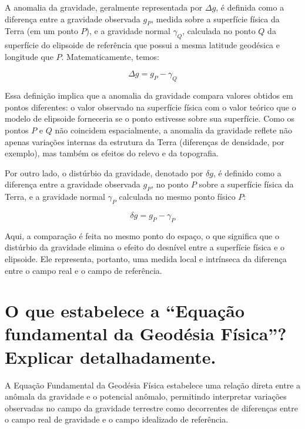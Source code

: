 A anomalia da gravidade, geralmente representada por \( \Delta g \), é definida como a diferença entre a gravidade observada \( g_P \), medida sobre a superfície física da Terra (em um ponto \( P \)), e a gravidade normal \( \gamma_Q \), calculada no ponto \( Q \) da superfície do elipsoide de referência que possui a mesma latitude geodésica e longitude que \( P \). Matematicamente, temos:

\[
\Delta g = g_P - \gamma_Q
\]

\noindent
Essa definição implica que a anomalia da gravidade compara valores obtidos em pontos diferentes: o valor observado na superfície física com o valor teórico que o modelo de elipsoide forneceria se o ponto estivesse sobre sua superfície. Como os pontos \( P \) e \( Q \) não coincidem espacialmente, a anomalia da gravidade reflete não apenas variações internas da estrutura da Terra (diferenças de densidade, por exemplo), mas também os efeitos do relevo e da topografia. 

Por outro lado, o distúrbio da gravidade, denotado por \( \delta g \), é definido como a diferença entre a gravidade observada \( g_P \), no ponto \( P \) sobre a superfície física da Terra, e a gravidade normal \( \gamma_P \) calculada no mesmo ponto físico \( P \):

\[
\delta g = g_P - \gamma_P
\]

\noindent
Aqui, a comparação é feita no mesmo ponto do espaço, o que significa que o distúrbio da gravidade elimina o efeito do desnível entre a superfície física e o elipsoide. Ele representa, portanto, uma medida local e intrínseca da diferença entre o campo real e o campo de referência.


\section{O que estabelece a “Equação fundamental da Geodésia Física”? Explicar detalhadamente.}

A Equação Fundamental da Geodésia Física estabelece uma relação direta entre a anômala da gravidade e o potencial anômalo, permitindo interpretar variações observadas no campo da gravidade terrestre como decorrentes de diferenças entre o campo real de gravidade e o campo idealizado de referência. 

